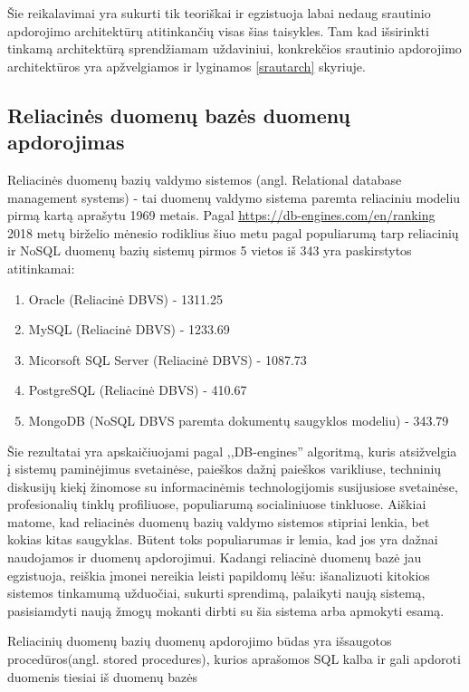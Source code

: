 \documentclass{VUMIFPSkursinis}
\begin{document}
        Šie reikalavimai yra sukurti tik teoriškai ir egzistuoja labai nedaug srautinio apdorojimo architektūrų atitinkančių visas šias taisykles. Tam kad išsirinkti tinkamą architektūrą sprendžiamam uždaviniui, 
        konkrekčios srautinio apdorojimo architektūros yra apžvelgiamos ir lyginamos \ref{srautarch} skyriuje.

\subsection{Reliacinės duomenų bazės duomenų apdorojimas}

    Reliacinės duomenų bazių valdymo sistemos (angl. Relational database management systems) - tai duomenų valdymo sistema paremta reliaciniu modeliu pirmą kartą aprašytu 1969 metais\cite{codd1969derivability}.
    Pagal \url{https://db-engines.com/en/ranking} 2018 metų birželio mėnesio rodiklius šiuo metu pagal populiarumą tarp reliacinių ir NoSQL duomenų bazių sistemų pirmos 5 vietos iš 343 yra paskirstytos atitinkamai:
    \begin{enumerate}
        \item Oracle (Reliacinė DBVS) - 1311.25
        \item MySQL (Reliacinė DBVS) - 1233.69
        \item Micorsoft SQL Server (Reliacinė DBVS) - 1087.73
        \item PostgreSQL (Reliacinė DBVS) - 410.67
        \item MongoDB (NoSQL DBVS paremta dokumentų saugyklos modeliu) - 343.79
    \end{enumerate}\par
        Šie rezultatai yra apskaičiuojami pagal ,,DB-engines'' algoritmą, kuris atsižvelgia į sistemų paminėjimus svetainėse, paieškos dažnį paieškos varikliuse, techninių diskusijų kiekį
    žinomose su informacinėmis technologijomis susijusiose svetainėse, profesionalių tinklų profiliuose, populiarumą socialiniuose tinkluose\cite{dbengines}. Aiškiai matome, kad reliacinės
    duomenų bazių valdymo sistemos stipriai lenkia, bet kokias kitas saugyklas. Būtent toks populiarumas ir lemia, kad jos yra dažnai naudojamos ir duomenų apdorojimui. Kadangi reliacinė
    duomenų bazė jau egzistuoja, reiškia įmonei nereikia leisti papildomų lėšu: išanalizuoti kitokios sistemos tinkamumą užduočiai, sukurti sprendimą, palaikyti naują sistemą, 
    pasisiamdyti naują žmogų mokanti dirbti su šia sistema arba apmokyti esamą. \par
        Reliacinių duomenų bazių duomenų apdorojimo būdas yra išsaugotos procedūros(angl. stored procedures), kurios aprašomos SQL kalba ir gali apdoroti duomenis tiesiai iš duomenų bazės 
\end{document}
